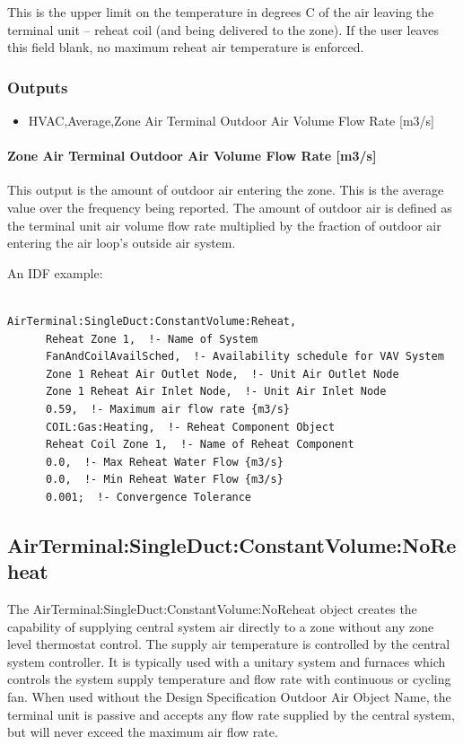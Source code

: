 This is the upper limit on the temperature in degrees C of the air leaving the terminal unit -- reheat coil (and being delivered to the zone). If the user leaves this field blank, no maximum reheat air temperature is enforced.

\subsubsection{Outputs}

\begin{itemize}
\item
  HVAC,Average,Zone Air Terminal Outdoor Air Volume Flow Rate {[}m3/s{]}
\end{itemize}

\paragraph{Zone Air Terminal Outdoor Air Volume Flow Rate {[}m3/s{]}}\label{zone-air-terminal-outdoor-air-volume-flow-rate-m3s}

This output is the amount of outdoor air entering the zone. This is the average value over the frequency being reported. The amount of outdoor air is defined as the terminal unit air volume flow rate multiplied by the fraction of outdoor air entering the air loop's outside air system.

An IDF example:

\begin{lstlisting}

AirTerminal:SingleDuct:ConstantVolume:Reheat,
      Reheat Zone 1,  !- Name of System
      FanAndCoilAvailSched,  !- Availability schedule for VAV System
      Zone 1 Reheat Air Outlet Node,  !- Unit Air Outlet Node
      Zone 1 Reheat Air Inlet Node,  !- Unit Air Inlet Node
      0.59,  !- Maximum air flow rate {m3/s}
      COIL:Gas:Heating,  !- Reheat Component Object
      Reheat Coil Zone 1,  !- Name of Reheat Component
      0.0,  !- Max Reheat Water Flow {m3/s}
      0.0,  !- Min Reheat Water Flow {m3/s}
      0.001;  !- Convergence Tolerance
\end{lstlisting}

\subsection{AirTerminal:SingleDuct:ConstantVolume:NoReheat}\label{airterminalsingleductconstantvolumenoreheat}
The AirTerminal:SingleDuct:ConstantVolume:NoReheat object creates the capability of supplying central system air directly to a zone without any zone level thermostat control. The supply air temperature is controlled by the central system controller. It is typically used with a unitary system and furnaces which controls the system supply temperature and flow rate with continuous or cycling fan. When used without the Design Specification Outdoor Air Object Name, the terminal unit is passive and accepts any flow rate supplied by the central system, but will never exceed the maximum air flow rate.

